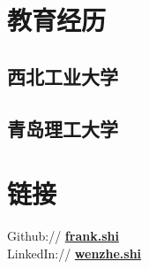 \documentclass[]{deedy-resume-openfont}
\begin{document}
%
%
\lastupdated

%
%

%
%

\begin{minipage}[t]{0.25\textwidth} 


\section{教育经历} 
\sectionsep

\subsection{西北工业大学}
\sectionsep

\subsection{青岛理工大学}
\sectionsep


\section{链接}
\sectionsep 
Github:// \href{https://github.com/frankopt}{\bf frank.shi} \\
LinkedIn://  \href{https://www.linkedin.com/in/wenzheshi/}{\bf wenzhe.shi} \\




\end{minipage}
\end{document}
